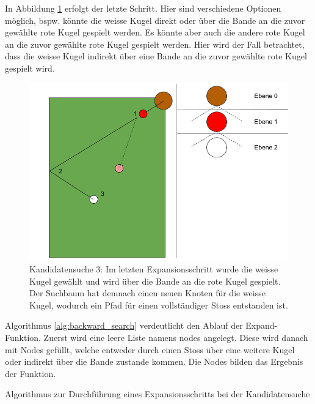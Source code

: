 In Abbildung \ref{fig:backwardsearch_3} erfolgt der letzte Schritt. Hier sind verschiedene Optionen möglich, bspw.
könnte die weisse Kugel direkt oder über die Bande an die zuvor gewählte rote Kugel gespielt werden. Es könnte aber auch
die andere rote Kugel an die zuvor gewählte rote Kugel gespielt werden. Hier wird der Fall betrachtet, dass die weisse Kugel
indirekt über eine Bande an die zuvor gewählte rote Kugel gespielt wird.
\begin{figure}[h!]
    \begin{center}
        \includegraphics[width=0.5\linewidth]{../common/03_billiard_ai/resources/13_backwardsearch_3.png}
    \end{center}
    \caption{Kandidatensuche 3: Im letzten Expansionsschritt wurde die weisse Kugel gewählt und wird über die Bande an die rote Kugel gespielt.
    Der Suchbaum hat demnach einen neuen Knoten für die weisse Kugel, wodurch ein Pfad für einen vollständiger Stoss entstanden ist.}
    \label{fig:backwardsearch_3}
\end{figure}

Algorithmus \ref{alg:backward_search} verdeutlicht den Ablauf der \glqq Expand-Funktion\grqq. Zuerst wird eine
leere Liste namens \glqq nodes\grqq{} angelegt. Diese wird danach mit Nodes gefüllt, welche entweder durch einen Stoss
über eine weitere Kugel oder indirekt über die Bande zustande kommen. Die Nodes bilden das Ergebnis der Funktion.

\begin{algorithm}[H]
    \DontPrintSemicolon
    \caption{Algorithmus zur Durchführung eines Expansionsschritts bei der Kandidatensuche}
    \label{alg:backward_search}
\end{algorithm}

